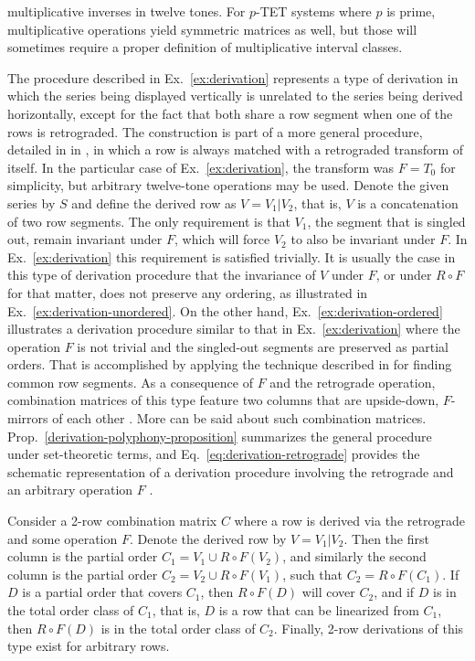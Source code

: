 multiplicative inverses in twelve tones. For $p$-TET systems where $p$ is prime, multiplicative operations yield symmetric matrices as well, but those will sometimes require a proper definition of multiplicative interval classes.

The procedure described in Ex.~\ref{ex:derivation} represents a type of derivation in which the series being displayed vertically is unrelated to the series being derived horizontally, except for the fact that both share a row segment when one of the rows is retrograded. The construction is part of a more general procedure, detailed in in \cite[211]{Starr1984}, in which a row is always matched with a retrograded transform of itself. In the particular case of Ex.~\ref{ex:derivation}, the transform was $F = T_0$ for simplicity, but arbitrary twelve-tone operations may be used. Denote the given series by $S$ and define the derived row as $V = V_1 | V_2$, that is, $V$ is a concatenation of two row segments. The only requirement is that $V_1$, the segment that is singled out, remain invariant under $F$, which will force $V_2$ to also be invariant under $F$. In Ex.~\ref{ex:derivation} this requirement is satisfied trivially. It is usually the case in this type of derivation procedure that the invariance of $V$ under $F$, or under $R \circ F$ for that matter, does not preserve any ordering, as illustrated in Ex.~\ref{ex:derivation-unordered}. On the other hand, Ex.~\ref{ex:derivation-ordered} illustrates a derivation procedure similar to that in Ex.~\ref{ex:derivation} where the operation $F$ is not trivial and the singled-out segments are preserved as partial orders. That is accomplished by applying the technique described in \cite[49]{Morris1987} for finding common row segments. As a consequence of $F$ and the retrograde operation, combination matrices of this type feature two columns that are upside-down, $F$-mirrors of each other \cite[211]{Starr1984}. More can be said about such combination matrices. Prop.~\ref{derivation-polyphony-proposition} summarizes the general procedure under set-theoretic terms, and Eq.~\ref{eq:derivation-retrograde} provides the schematic representation of a derivation procedure involving the retrograde and an arbitrary operation $F$ \cite[212]{Starr1984}.

\begin{proposition}
	\label{derivation-polyphony-proposition}
    \cite[211, 214]{Starr1984}
    Consider a 2-row combination matrix $C$ where a row is derived via the retrograde and some operation $F$. Denote the derived row by $V = V_1 | V_2$. Then the first column is the partial order $C_1 = V_1 \cup R \circ F(V_2)$, and similarly the second column is the partial order $C_2 = V_2 \cup R \circ F(V_1)$, such that $C_2 = R \circ F(C_1)$. If $D$ is a partial order that covers $C_1$, then $R \circ F(D)$ will cover $C_2$, and if $D$ is in the total order class of $C_1$, that is, $D$ is a row that can be linearized from $C_1$, then $R \circ F(D)$ is in the total order class of $C_2$. Finally, 2-row derivations of this type exist for arbitrary rows.
\end{proposition}

